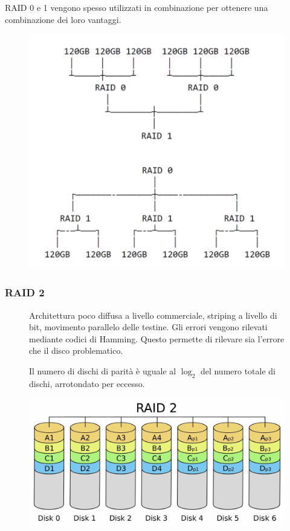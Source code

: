 \begin{note}
    RAID 0 e 1 vengono spesso utilizzati in combinazione per ottenere una combinazione dei loro vantaggi.

    \begin{figure}[H]
        \centering
        \includegraphics[width=0.4\linewidth]{assets/RAID01.jpeg}
    \end{figure}
\end{note}

\subsubsection*{RAID 2}
\begin{figure}[H]
    \centering
    \begin{minipage}{0.65\textwidth}
        Architettura poco diffusa a livello commerciale, striping a livello di bit, movimento parallelo delle testine. Gli errori vengono rilevati mediante codici di Hamming. Questo permette di rilevare sia l'errore che il disco problematico.

        Il numero di dischi di parità è uguale al $\log_2$ del numero totale di dischi, arrotondato per eccesso.
    \end{minipage}
    \hfill
    \begin{minipage}{0.3\textwidth}
        \centering
        \includegraphics[width=1\linewidth]{assets/RAID_2.jpeg}
    \end{minipage}
\end{figure}

